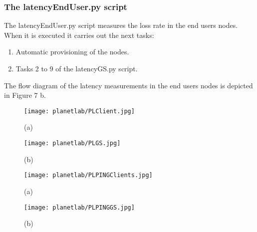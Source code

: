 \subsubsection{The latencyEndUser.py script}

The latencyEndUser.py  script measures the loss rate in the end users
nodes. When it is executed it carries out the next tasks:
\begin{enumerate}
\item Automatic provisioning of the nodes.
\item Tasks 2 to 9 of the latencyGS.py script.
\end{enumerate}

The flow diagram of the latency measurements in the end users nodes is depicted
in Figure 7 b.

\begin{multicols}{2}
\begin{figure}[!h]
\begin{center}
\texttt{[image: planetlab/PLClient.jpg]}
\caption{(a)}
\label{fig:ple-workflow-bandwidth}
\end{center}
\end{figure}
\columnbreak
\begin{figure}[!h]
\begin{center}
\texttt{[image: planetlab/PLGS.jpg]}
\caption{(b)}
\label{fig:ple-workflow-loss-rate}
\end{center}
\end{figure}
\end{multicols}

\begin{multicols}{2}
\begin{figure}[!h]
\begin{center}
\texttt{[image: planetlab/PLPINGClients.jpg]}
\caption{(a)}
\label{fig:ple-workflow-latency-user}
\end{center}
\end{figure}
\columnbreak
\begin{figure}[!h]
\begin{center}
\texttt{[image: planetlab/PLPINGGS.jpg]}
\caption{(b)}
\label{fig:ple-workflow-latency-gs}
\end{center}
\end{figure}
\end{multicols}


